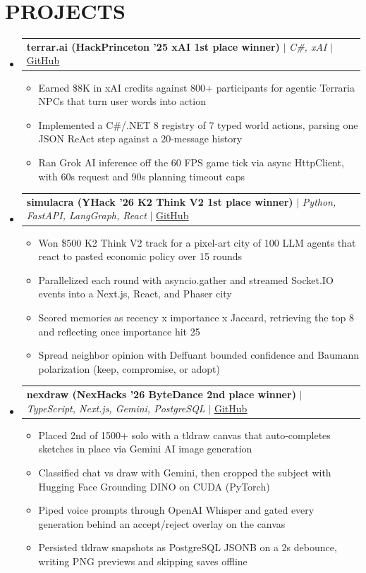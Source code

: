 \documentclass[letterpaper,11pt]{article}
\makeatletter
\newcommand{\resumeItem}[1]{
  \item\small{
    {#1 \vspace{-4pt}}
  }
}
\newcommand{\resumeProjectHeading}[2]{
    \item
    \begin{tabular*}{0.97\textwidth}[t]{l@{\extracolsep{\fill}}r}
      #1 & #2 \\
    \end{tabular*}\vspace{-7pt}
}
\newcommand{\resumeSubHeadingListStart}{\begin{itemize}[leftmargin=0.15in, label={}]}
\newcommand{\resumeSubHeadingListEnd}{\end{itemize}}
\newcommand{\resumeItemListStart}{\begin{itemize}}
\newcommand{\resumeItemListEnd}{\end{itemize}\vspace{-6pt}}
\makeatother
\begin{document}
\section{\textbf{PROJECTS}}
    \resumeSubHeadingListStart
    \resumeProjectHeading
  {\textbf{terrar.ai (HackPrinceton '25 xAI 1st place winner)}
  $|$
  \emph{C\#, xAI}
  $|$
  \href{https://github.com/SlothfulDreams/terrar.ai}{\underline{GitHub \faGithub}}
  }
  {}
  \resumeItemListStart
    \resumeItem{Earned \$8K in xAI credits against 800+ participants for agentic Terraria NPCs that turn user words into action}
    \resumeItem{Implemented a C\#/.NET 8 registry of 7 typed world actions, parsing one JSON ReAct step against a 20-message history}
    \resumeItem{Ran Grok AI inference off the 60 FPS game tick via async HttpClient, with 60s request and 90s planning timeout caps}
  \resumeItemListEnd
     \resumeProjectHeading
  {\textbf{simulacra (YHack '26 K2 Think V2 1st place winner)}
  $|$
  \emph{Python, FastAPI, LangGraph, React}
  $|$
  \href{https://github.com/AdamPSU/simulacra}{\underline{GitHub \faGithub}}
  }{}
  \resumeItemListStart
    \resumeItem{Won \$500 K2 Think V2 track for a pixel-art city of 100 LLM agents that react to pasted economic policy over 15 rounds}
    \resumeItem{Parallelized each round with asyncio.gather and streamed Socket.IO events into a Next.js, React, and Phaser city}
    \resumeItem{Scored memories as recency x importance x Jaccard, retrieving the top 8 and reflecting once importance hit 25}
    \resumeItem{Spread neighbor opinion with Deffuant bounded confidence and Baumann polarization (keep, compromise, or adopt)}
  \resumeItemListEnd
    \resumeProjectHeading
  {\textbf{nexdraw (NexHacks '26 ByteDance 2nd place winner)}
  $|$
  \emph{TypeScript, Next.js, Gemini, PostgreSQL}
  $|$
  \href{https://github.com/AdamPSU/maestro}{\underline{GitHub \faGithub}}
  }
  {}
  \resumeItemListStart
    \resumeItem{Placed 2nd of 1500+ solo with a tldraw canvas that auto-completes sketches in place via Gemini AI image generation}
    \resumeItem{Classified chat vs draw with Gemini, then cropped the subject with Hugging Face Grounding DINO on CUDA (PyTorch)}
    \resumeItem{Piped voice prompts through OpenAI Whisper and gated every generation behind an accept/reject overlay on the canvas}
    \resumeItem{Persisted tldraw snapshots as PostgreSQL JSONB on a 2s debounce, writing PNG previews and skipping saves offline}
  \resumeItemListEnd
    \resumeSubHeadingListEnd

\end{document}
